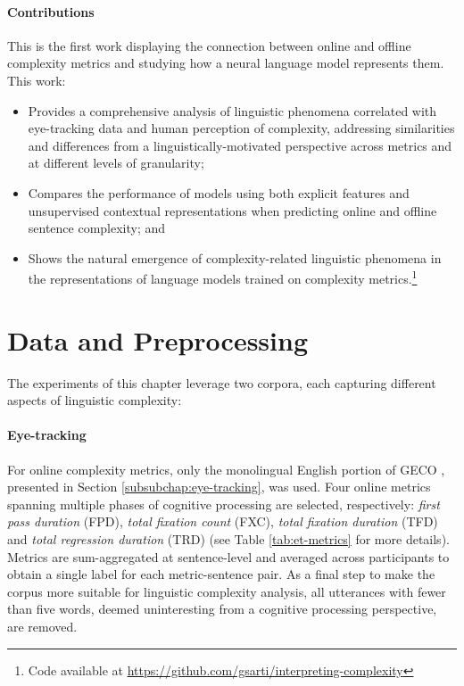\documentclass[a4paper, nobind]{templates/ociamthesis}
\begin{document}
\paragraph{Contributions} This is the first work displaying the connection between online and offline complexity metrics and studying how a neural language model represents them. This work:

\begin{itemize}
\item
  Provides a comprehensive analysis of linguistic phenomena correlated with eye-tracking data and human perception of complexity, addressing similarities and differences from a linguistically-motivated perspective across metrics and at different levels of granularity;
\item
  Compares the performance of models using both explicit features and unsupervised contextual representations when predicting online and offline sentence complexity; and
\item
  Shows the natural emergence of complexity-related linguistic phenomena in the representations of language models trained on complexity metrics.\footnote{Code available at \url{https://github.com/gsarti/interpreting-complexity}}
\end{itemize}

\hypertarget{subchap:ex1-data}{%
\section{Data and Preprocessing}\label{subchap:ex1-data}}

The experiments of this chapter leverage two corpora, each capturing different aspects of linguistic complexity:

\paragraph{Eye-tracking} For online complexity metrics, only the monolingual English portion of GECO \autocite{cop-etal-2017-presenting}, presented in Section \ref{subsubchap:eye-tracking}, was used. Four online metrics spanning multiple phases of cognitive processing are selected, respectively: \emph{first pass duration} (FPD), \emph{total fixation count} (FXC), \emph{total fixation duration} (TFD) and \emph{total regression duration} (TRD) (see Table \ref{tab:et-metrics} for more details). Metrics are sum-aggregated at sentence-level and averaged across participants to obtain a single label for each metric-sentence pair. As a final step to make the corpus more suitable for linguistic complexity analysis, all utterances with fewer than five words, deemed uninteresting from a cognitive processing perspective, are removed.
\end{document}
